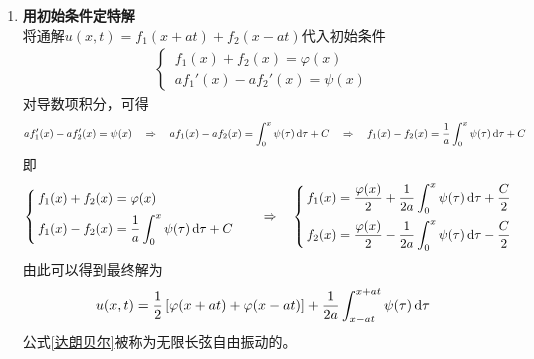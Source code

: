 \begin{enumerate}[\textbf{步骤}1 ]
	\item \textbf{用初始条件定特解}\\
	将通解$u(x,t) = f_1(x+at) + f_2(x-at)$代入初始条件
	\begin{align*}
		\begin{cases}
			\, f_1(x) + f_2(x) = \varphi (x)\\
			\, af_1'(x) - af_2'(x) = \psi(x)
		\end{cases}
	\end{align*}
	对导数项积分，可得
	\begin{align*}
		af_1'(x) - af_2'(x) = \psi(x) \quad \Rightarrow \quad af_1(x) - af_2(x) = \int_0^x \psi(\tau) \, {\rm{d}} \tau + C \quad \Rightarrow \quad f_1(x) - f_2(x) = \dfrac{1}{a} \int_0^x \psi(\tau) \, {\rm{d}} \tau + C
	\end{align*}
	即
	\begin{align}
		\begin{cases}
			\, f_1(x) + f_2(x) = \varphi (x)\\[0.5em]
			\, \displaystyle f_1(x) - f_2(x) = \dfrac{1}{a} \int_0^x \psi(\tau) \, {\rm{d}} \tau + C
		\end{cases}
		\quad \Rightarrow \quad
		\begin{cases}
			\,\displaystyle  f_1(x) = \dfrac{\varphi(x)}{2} + \dfrac{1}{2a} \int_0^x \psi(\tau) \, {\rm{d}} \tau + \dfrac{C}{2}\\[1em]
			\, \displaystyle f_2(x) = \dfrac{\varphi(x)}{2} - \dfrac{1}{2a} \int_0^x \psi(\tau) \, {\rm{d}} \tau - \dfrac{C}{2}
		\end{cases}
	\end{align}
	由此可以得到最终解为
	\begin{align}
		u(x,t) = \dfrac{1}{2}\left[\varphi(x+at) + \varphi(x -at)\right] + \dfrac{1}{2a} \int_{x - at}^{x + at}\psi(\tau) \, {\rm{d}} \tau
		\label{达朗贝尔}
	\end{align}
	公式\eqref{达朗贝尔}被称为无限长弦自由振动的。
\end{enumerate}

